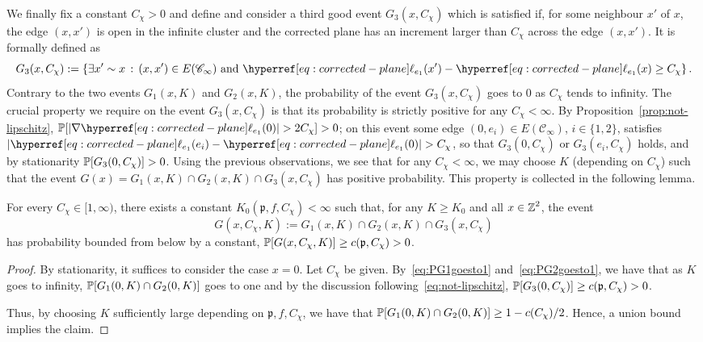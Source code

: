 \documentclass[12pt]{amsart}
\numberwithin{equation}{section}
\begin{document}
	We finally fix a constant $C_\chi > 0$ and define and consider a third good event $G_3 (x , C_{\chi})$ which is satisfied if, for some neighbour $x'$ of $x$, the edge $(x, x')$ is open in the infinite cluster and the corrected plane has
	an increment larger than $C_\chi$ across the edge $(x, x')$. It is formally defined as
	\begin{equation} \label{eq:not-lipschitz}
		G_3(x,  C_{\chi}) := \left\{ \exists x' \sim x \, : \, (x , x') \in E(\mathscr{C}_\infty) ~\mbox{and}~ \ellp{e_1}(x') - \ellp{e_1}(x) \geq C_\chi  \right\}.
	\end{equation}
	Contrary to the two events $G_1(x , K)$ and $G_2(x,K)$, the probability of the event $G_3(x, C_{\chi})$ goes to $0$ as $C_{\chi}$ tends to infinity. The crucial property we require on the event $G_3(x , C_{\chi})$ is that its probability is strictly positive for any $C_{\chi} < \infty$. By Proposition~\ref{prop:not-lipschitz}, $\P[ |\nabla \ellp{e_1}(0)| > 2 C_\chi ] > 0$; on this event some edge $(0 , e_i) \in E(\mathscr{C}_\infty)$, $i \in \{1 , 2\}$, satisfies $|\ellp{e_1}(e_i) - \ellp{e_1}(0)| > C_\chi$, so that $G_3(0 , C_\chi)$ or $G_3(e_i , C_\chi)$ holds, and by stationarity $\P[G_3(0 , C_\chi)] > 0$. Using the previous observations, we see that for any $C_\chi < \infty$, we may choose $K$ (depending on $C_\chi$) such that the event $G(x) = G_1(x, K) \cap G_2(x , K) \cap G_3(x,  C_{\chi})$ has positive probability. This property is collected in the following lemma.
	
	\begin{lemma} \label{lemma:good-event-lower-bound}
		For every $C_{\chi} \in [1 , \infty)$, there exists a constant $K_0(\mathfrak{p} , f , C_\chi) < \infty$ such that, for any $K \geq K_0$ and all $x \in \Z^2$, the event 
		\begin{equation} \label{eq:def-good-event}
			G(x, C_\chi , K) := G_1(x, K) \cap G_2(x, K) \cap G_3(x, C_{\chi})
		\end{equation}
		has probability bounded from below by a constant, $\P[G(x , C_\chi , K )] \geq c(\mathfrak{p} , C_\chi) > 0$.     
	\end{lemma}
	
	\begin{proof}
		By stationarity, it suffices to consider the case $x = 0$.  Let $C_{\chi}$ be given. 
		By~\eqref{eq:PG1goesto1} and~\eqref{eq:PG2goesto1}, we have that as $K$ goes to infinity, $\P[G_1(0 , K) \cap G_2(0 , K)]$ goes to one
		and by the discussion following~\eqref{eq:not-lipschitz}, $\P[G_3(0 , C_\chi)] \geq c(\mathfrak{p}, C_{\chi}) > 0$. 
		
		Thus, by choosing $K$ sufficiently large depending on $\mathfrak{p}, f , C_{\chi}$,  we have that  $\P[G_1(0 , K) \cap G_2(0 , K)] \geq 1 - c(C_{\chi})/2$. 
		Hence, a union bound implies the claim. \end{proof}
	
\end{document}
